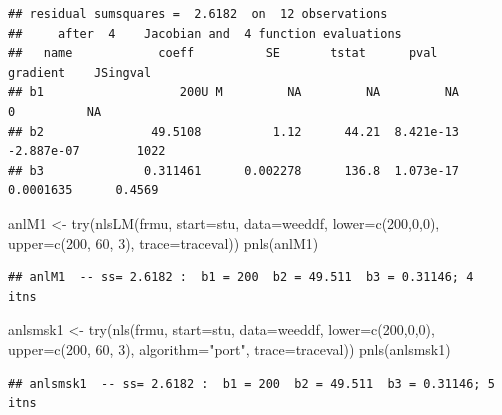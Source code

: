 \documentclass[
]{article}
\newenvironment{Shaded}{\begin{snugshade}}{\end{snugshade}}
\newcommand{\AttributeTok}[1]{\textcolor[rgb]{0.77,0.63,0.00}{#1}}
\newcommand{\DecValTok}[1]{\textcolor[rgb]{0.00,0.00,0.81}{#1}}
\newcommand{\FunctionTok}[1]{\textcolor[rgb]{0.00,0.00,0.00}{#1}}
\newcommand{\NormalTok}[1]{#1}
\newcommand{\OtherTok}[1]{\textcolor[rgb]{0.56,0.35,0.01}{#1}}
\newcommand{\StringTok}[1]{\textcolor[rgb]{0.31,0.60,0.02}{#1}}
\begin{document}
\begin{verbatim}
## residual sumsquares =  2.6182  on  12 observations
##     after  4    Jacobian and  4 function evaluations
##   name            coeff          SE       tstat      pval      gradient    JSingval   
## b1                   200U M         NA         NA         NA           0          NA  
## b2               49.5108          1.12      44.21  8.421e-13  -2.887e-07        1022  
## b3              0.311461      0.002278      136.8  1.073e-17   0.0001635      0.4569
\end{verbatim}

\begin{Shaded}
\begin{Highlighting}[]
\NormalTok{anlM1 }\OtherTok{\textless{}{-}} \FunctionTok{try}\NormalTok{(}\FunctionTok{nlsLM}\NormalTok{(frmu, }\AttributeTok{start=}\NormalTok{stu, }\AttributeTok{data=}\NormalTok{weeddf, }\AttributeTok{lower=}\FunctionTok{c}\NormalTok{(}\DecValTok{200}\NormalTok{,}\DecValTok{0}\NormalTok{,}\DecValTok{0}\NormalTok{), }
            \AttributeTok{upper=}\FunctionTok{c}\NormalTok{(}\DecValTok{200}\NormalTok{, }\DecValTok{60}\NormalTok{, }\DecValTok{3}\NormalTok{), }\AttributeTok{trace=}\NormalTok{traceval))}
\FunctionTok{pnls}\NormalTok{(anlM1)}
\end{Highlighting}
\end{Shaded}

\begin{verbatim}
## anlM1  -- ss= 2.6182 :  b1 = 200  b2 = 49.511  b3 = 0.31146; 4  itns
\end{verbatim}

\begin{Shaded}
\begin{Highlighting}[]
\NormalTok{anlsmsk1 }\OtherTok{\textless{}{-}} \FunctionTok{try}\NormalTok{(}\FunctionTok{nls}\NormalTok{(frmu, }\AttributeTok{start=}\NormalTok{stu, }\AttributeTok{data=}\NormalTok{weeddf, }\AttributeTok{lower=}\FunctionTok{c}\NormalTok{(}\DecValTok{200}\NormalTok{,}\DecValTok{0}\NormalTok{,}\DecValTok{0}\NormalTok{), }
        \AttributeTok{upper=}\FunctionTok{c}\NormalTok{(}\DecValTok{200}\NormalTok{, }\DecValTok{60}\NormalTok{, }\DecValTok{3}\NormalTok{),  }\AttributeTok{algorithm=}\StringTok{"port"}\NormalTok{, }\AttributeTok{trace=}\NormalTok{traceval))}
\FunctionTok{pnls}\NormalTok{(anlsmsk1)}
\end{Highlighting}
\end{Shaded}

\begin{verbatim}
## anlsmsk1  -- ss= 2.6182 :  b1 = 200  b2 = 49.511  b3 = 0.31146; 5  itns
\end{verbatim}
\end{document}
